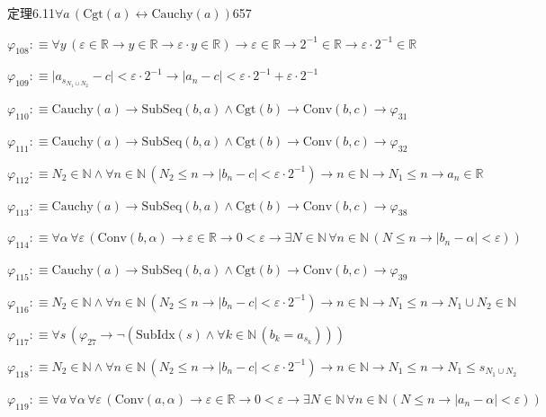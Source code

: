 \begin{fullproof}{定理6.11}{$\forall a\,(\mathrm{Cgt}(a) \leftrightarrow \mathrm{Cauchy}(a))$}{657}
\begin{abbrevlist}
\item $\varphi_{108} :\equiv \forall y\,(\varepsilon \in \mathbb{R} \to y \in \mathbb{R} \to \varepsilon \cdot y \in \mathbb{R}) \to \varepsilon \in \mathbb{R} \to 2^{-1} \in \mathbb{R} \to \varepsilon \cdot 2^{-1} \in \mathbb{R}$
\item $\varphi_{109} :\equiv \lvert a_{s_{N_{1} \cup N_{2}}} - c \rvert < \varepsilon \cdot 2^{-1} \to \lvert a_{n} - c \rvert < \varepsilon \cdot 2^{-1} + \varepsilon \cdot 2^{-1}$
\item $\varphi_{110} :\equiv \mathrm{Cauchy}(a) \to \mathrm{SubSeq}(b,a) \land \mathrm{Cgt}(b) \to \mathrm{Conv}(b,c) \to \varphi_{31}$
\item $\varphi_{111} :\equiv \mathrm{Cauchy}(a) \to \mathrm{SubSeq}(b,a) \land \mathrm{Cgt}(b) \to \mathrm{Conv}(b,c) \to \varphi_{32}$
\item $\varphi_{112} :\equiv N_{2} \in \mathbb{N} \land \forall n \in \mathbb{N}\,(N_{2} \leq n \to \lvert b_{n} - c \rvert < \varepsilon \cdot 2^{-1}) \to n \in \mathbb{N} \to N_{1} \leq n \to a_{n} \in \mathbb{R}$
\item $\varphi_{113} :\equiv \mathrm{Cauchy}(a) \to \mathrm{SubSeq}(b,a) \land \mathrm{Cgt}(b) \to \mathrm{Conv}(b,c) \to \varphi_{38}$
\item $\varphi_{114} :\equiv \forall \alpha\,\forall \varepsilon\,(\mathrm{Conv}(b,\alpha) \to \varepsilon \in \mathbb{R} \to 0 < \varepsilon \to \exists N \in \mathbb{N}\,\forall n \in \mathbb{N}\,(N \leq n \to \lvert b_{n} - \alpha \rvert < \varepsilon))$
\item $\varphi_{115} :\equiv \mathrm{Cauchy}(a) \to \mathrm{SubSeq}(b,a) \land \mathrm{Cgt}(b) \to \mathrm{Conv}(b,c) \to \varphi_{39}$
\item $\varphi_{116} :\equiv N_{2} \in \mathbb{N} \land \forall n \in \mathbb{N}\,(N_{2} \leq n \to \lvert b_{n} - c \rvert < \varepsilon \cdot 2^{-1}) \to n \in \mathbb{N} \to N_{1} \leq n \to N_{1} \cup N_{2} \in \mathbb{N}$
\item $\varphi_{117} :\equiv \forall s\,(\varphi_{27} \to \neg (\mathrm{SubIdx}(s) \land \forall k \in \mathbb{N}\,(b_{k} = a_{s_{k}})))$
\item $\varphi_{118} :\equiv N_{2} \in \mathbb{N} \land \forall n \in \mathbb{N}\,(N_{2} \leq n \to \lvert b_{n} - c \rvert < \varepsilon \cdot 2^{-1}) \to n \in \mathbb{N} \to N_{1} \leq n \to N_{1} \leq s_{N_{1} \cup N_{2}}$
\item $\varphi_{119} :\equiv \forall a\,\forall \alpha\,\forall \varepsilon\,(\mathrm{Conv}(a,\alpha) \to \varepsilon \in \mathbb{R} \to 0 < \varepsilon \to \exists N \in \mathbb{N}\,\forall n \in \mathbb{N}\,(N \leq n \to \lvert a_{n} - \alpha \rvert < \varepsilon))$

\end{abbrevlist}
\end{fullproof}
